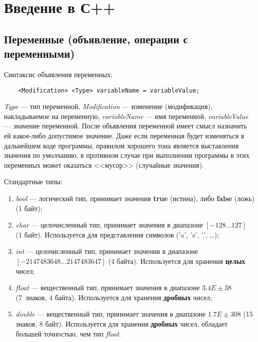 \section{Введение в С++}

\subsection{Переменные (объявление, операции с переменными)}

Синтаксис объявления переменных:
\lstset{style=CPlusPlus}
\begin{lstlisting}
    <Modification> <Type> variableName = variableValue; 
\end{lstlisting}

\textit{Type} --- тип переменной, \textit{Modification} --- изменение (модификация), накладываемое на переменную, \textit{variableName} --- имя переменной, \textit{variableValue} --- значение переменной. После объявления переменной имеет смысл назначить ей какое-либо допустимое значение. Даже если переменная будет изменяться в дальнейшем коде программы, правилом хорошего тона является выставления значения по умолчанию, в противном случае при выполнении программы в этих переменных может оказаться <<мусор>> (случайные значения).

Стандартные типы:
\begin{enumerate}
    \item \textit{bool} --- логический тип, принимает значения \textbf{true} (истина), либо \textbf{false} (ложь) (1 байт);
    \item \textit{char} --- целочисленный тип, принимает значения в диапазоне $\left[ -128 \ldots 127 \right]$ (1 байт). Используется для представления символов ('a', 'z', '.', \ldots);
    \item \textit{int} --- целочисленный тип, принимает значения в диапазоне \\ $\left[ -2147483648 \ldots 2147483647 \right]$ (4 байта). Используется для хранения \textbf{целых} чисел;
    \item \textit{float} --- вещественный тип, принимает значения в диапазоне $3.4E \pm 38$ (7~знаков, 4 байта). Используется для хранения \textbf{дробных} чисел;
    \item \textit{double} --- вещественный тип, принимает значения в диапазоне $1.7E \pm 308$ (15 знаков, 8 байт). Используется для хранения \textbf{дробных} чисел, обладает большей точностью, чем тип \textit{float}.  
\end{enumerate} 

